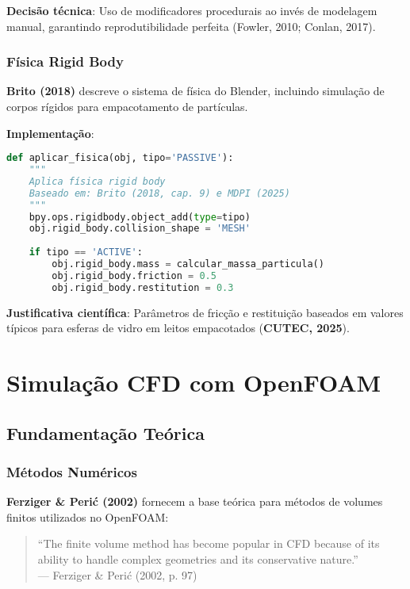 \documentclass[12pt,a4paper]{article}
\begin{document}
\textbf{Decisão técnica}: Uso de modificadores procedurais ao invés de modelagem manual, garantindo reprodutibilidade perfeita (Fowler, 2010; Conlan, 2017).

\subsubsection{Física Rigid Body}

\textbf{Brito (2018)} descreve o sistema de física do Blender, incluindo simulação de corpos rígidos para empacotamento de partículas.

\textbf{Implementação}:
\begin{lstlisting}[language=Python, caption=Configuração de física rigid body]
def aplicar_fisica(obj, tipo='PASSIVE'):
    """
    Aplica física rigid body
    Baseado em: Brito (2018, cap. 9) e MDPI (2025)
    """
    bpy.ops.rigidbody.object_add(type=tipo)
    obj.rigid_body.collision_shape = 'MESH'
    
    if tipo == 'ACTIVE':
        obj.rigid_body.mass = calcular_massa_particula()
        obj.rigid_body.friction = 0.5
        obj.rigid_body.restitution = 0.3
\end{lstlisting}

\textbf{Justificativa científica}: Parâmetros de fricção e restituição baseados em valores típicos para esferas de vidro em leitos empacotados (\textbf{CUTEC, 2025}).

\section{Simulação CFD com OpenFOAM}

\subsection{Fundamentação Teórica}

\subsubsection{Métodos Numéricos}

\textbf{Ferziger \& Perić (2002)} fornecem a base teórica para métodos de volumes finitos utilizados no OpenFOAM:

\begin{quote}
``The finite volume method has become popular in CFD because of its ability to handle complex geometries and its conservative nature.''\\
— Ferziger \& Perić (2002, p. 97)
\end{quote}
\end{document}
